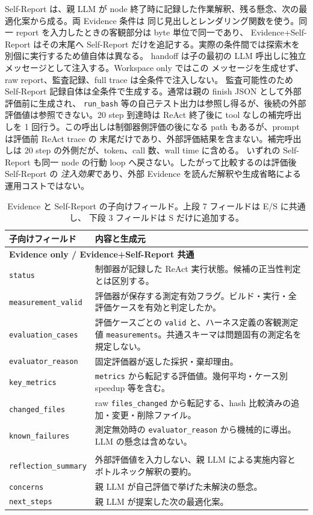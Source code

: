 \documentclass[conference,letterpaper]{IEEEtran}
\newcommand{\armW}{Workspace only}
\newcommand{\armE}{Evidence only}
\newcommand{\armS}{Evidence+Self-Report}
\begin{document}
Self-Report は、親 LLM が node 終了時に記録した作業解釈、残る懸念、次の最適化案から成る。両 Evidence 条件は
同じ見出しとレンダリング関数を使う。同一 report を入力したときの客観部分は byte 単位で同一であり、
\armS{} はその末尾へ Self-Report だけを追記する。実際の条件間では探索木を別個に実行するため値自体は異なる。
handoff は子の最初の LLM 呼出しに独立メッセージとして注入する。\armW{} ではこの
メッセージを生成せず、raw report、監査記録、full trace は全条件で注入しない。
監査可能性のため Self-Report 記録自体は全条件で生成する。通常は親の finish JSON として外部評価前に生成され、
\texttt{run\_bash} 等の自己テスト出力は参照し得るが、後続の外部評価値は参照できない。20 step 到達時は ReAct 終了後に
tool なしの補完呼出しを 1 回行う。この呼出しは制御器側評価の後になる path もあるが、prompt は評価前 ReAct trace の
末尾だけであり、外部評価結果を含まない。補完呼出しは 20 step の外側だが、token、call 数、wall time に含める。
いずれの Self-Report も同一 node の行動 loop へ戻さない。したがって比較するのは評価後 Self-Report の
\emph{注入効果}であり、外部 Evidence を読んだ解釈や生成省略による運用コストではない。

\begin{table}[t]\centering\footnotesize
\caption{Evidence と Self-Report の子向けフィールド。上段 7 フィールドは E/S に共通し、
下段 3 フィールドは S だけに追加する。}
\label{tab:handoff-fields}
\begin{tabular}{p{3.7cm}p{10.2cm}}
\toprule
子向けフィールド & 内容と生成元 \\
\midrule
\multicolumn{2}{l}{\textbf{\armE{} / \armS{} 共通}}\\
\texttt{status}
  & 制御器が記録した ReAct 実行状態。候補の正当性判定とは区別する。\\
\texttt{measurement\_valid}
  & 評価器が保存する測定有効フラグ。ビルド・実行・全評価ケースを有効と判定したか。\\
\texttt{evaluation\_cases}
  & 評価ケースごとの \texttt{valid} と、ハーネス定義の客観測定値
    \texttt{measurements}。共通スキーマは問題固有の測定名を規定しない。\\
\texttt{evaluator\_reason}
  & 固定評価器が返した採択・棄却理由。\\
\texttt{key\_metrics}
  & \texttt{metrics} から転記する評価値。幾何平均・ケース別 speedup 等を含む。\\
\texttt{changed\_files}
  & raw \texttt{files\_changed} から転記する、hash 比較済みの追加・変更・削除ファイル。\\
\texttt{known\_failures}
  & 測定無効時の \texttt{evaluator\_reason} から機械的に導出。LLM の懸念は含めない。\\
\addlinespace
\multicolumn{2}{l}{\textbf{\armS{} のみ：評価後の親 Self-Report}}\\
\texttt{reflection\_summary}
  & 外部評価値を入力しない、親 LLM による実施内容とボトルネック解釈の要約。\\
\texttt{concerns}
  & 親 LLM が自己評価で挙げた未解決の懸念。\\
\texttt{next\_steps}
  & 親 LLM が提案した次の最適化案。\\
\bottomrule
\end{tabular}
\end{table}
\end{document}
